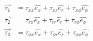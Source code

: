 \begin{equation}
  \begin{aligned}
    \overrightarrow{\tau_1} 
    &= \tau_{xx}\hat{e_x}
    + \tau_{xr}\hat{e_r}
    + \tau_{x\phi}\hat{e_\phi} \\
     \overrightarrow{\tau_2} 
    &= \tau_{rx}\hat{e_x}
    + \tau_{rr}\hat{e_r}
    + \tau_{r\phi}\hat{e_\phi} \\
     \overrightarrow{\tau_3} 
    &= \tau_{\phi x}\hat{e_x}
    + \tau_{\phi r}\hat{e_r}
    + \tau_{\phi\phi}\hat{e_\phi}
  \end{aligned}
\end{equation}

